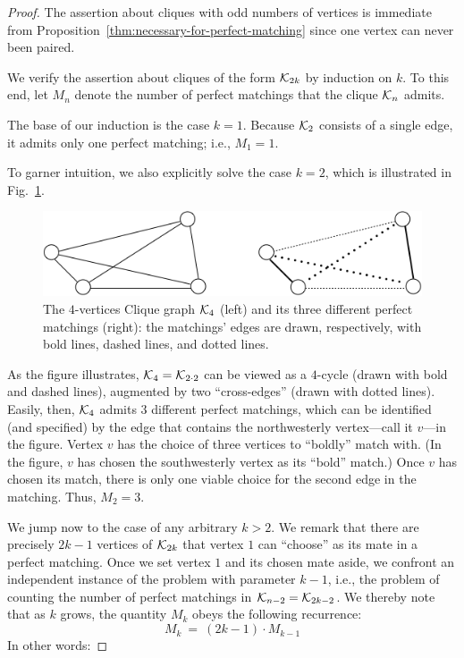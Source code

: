 \begin{proof}
The assertion about cliques with odd numbers of vertices is immediate
from Proposition~\ref{thm:necessary-for-perfect-matching}
 since one vertex can never been paired.

We verify the assertion about cliques of the form $\mbox{$\cal K$}_{2k}$ by
induction on $k$.  To this end, let $M_n$ denote the number of perfect
matchings that the clique $\mbox{$\cal K$}_n$ admits.

The base of our induction is the case $k=1$.  Because $\mbox{$\cal K$}_{2}$
consists of a single edge, it admits only one perfect matching; i.e.,
$M_1 = 1$.

To garner intuition, we also explicitly solve the case $k=2$, which is
illustrated in Fig.~\ref{fig:AllPerfectMatchings}.
\begin{figure}[hbt]
\begin{center}
       \includegraphics[scale=0.55]{FiguresGraph/perfectmatchingAll}
       \caption{The $4$-vertices Clique graph  $\mbox{$\cal K$}_4$ (left) and its three different perfect matchings (right): 
       the matchings' edges are drawn, respectively, with bold lines, dashed lines, and dotted lines.}
  \label{fig:AllPerfectMatchings}
\end{center}
\end{figure}
As the figure illustrates, $\mbox{$\cal K$}_4 = \mbox{$\cal K$}_{2 \cdot 2}$ can be viewed as a
$4$-cycle (drawn with bold and dashed lines), augmented by two
``cross-edges'' (drawn with dotted lines).  Easily, then, $\mbox{$\cal K$}_4$
admits $3$ different perfect matchings, which can be identified (and
specified) by the edge that contains the northwesterly vertex---call it
$v$---in the figure.  Vertex $v$ has the choice of three vertices to
``boldly'' match with. (In the figure, $v$ has chosen the
southwesterly vertex as its ``bold'' match.)  Once $v$ has chosen its
match, there is only one viable choice for the second edge in the
matching.  Thus, $M_2=3$.

We jump now to the case of any arbitrary $k > 2$.  We remark that
there are precisely $2k-1$ vertices of $\mbox{$\cal K$}_{2k}$ that vertex $1$ can
``choose'' as its mate in a perfect matching.  Once we set vertex $1$
and its chosen mate aside, we confront an independent instance of the
problem with parameter $k-1$, i.e., the problem of counting the number
of perfect matchings in $\mbox{$\cal K$}_{n-2} = \mbox{$\cal K$}_{2k-2}$.  We thereby note that
as $k$ grows, the quantity $M_k$ obeys the following recurrence:
\[ M_k \ = \ (2k-1) \cdot M_{k-1} \]
In other words:


\end{proof}
